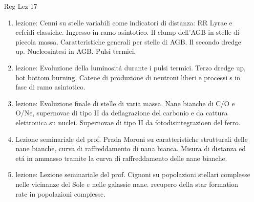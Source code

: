 \begin{frame}[allowframebreaks]{Reg Lez 17}
\begin{enumerate}
\item lezione: Cenni su stelle variabili come indicatori di distanza: RR Lyrae e cefeidi classiche. Ingresso in ramo asintotico. Il clump dell'AGB in stelle di piccola massa. Caratteristiche generali per stelle di AGB. Il secondo dredge up. Nucleosintesi in AGB. Pulsi termici.
\item lezione: Evoluzione della luminosit\'a durante i pulsi termici. Terzo dredge up, hot bottom burning. Catene di produzione di neutroni liberi e processi s in fase di ramo asintotico.
\item lezione: Evoluzione finale di stelle di varia massa. Nane bianche di C/O e O/Ne, supernovae di tipo II da deflagrazione del carbonio e da cattura elettronica su nuclei. Supernovae di tipo II da fotodisintegrazioen del ferro.
\item Lezione seminariale del prof. Prada Moroni su caratteristiche strutturali delle nane bianche, curva di raffreddamento di nana bianca. Misura di distanza ed et\'a in ammasso tramite la curva di raffreddamento delle nane bianche.
\item lezione: Lezione seminariale del prof. Cignoni su popolazioni stellari complesse nelle vicinanze del Sole e nelle galassie nane. recupero della star formation rate in popolazioni complesse.
\end{enumerate}
\end{frame}
